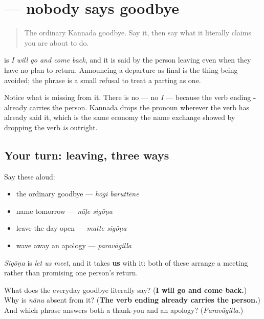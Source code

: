 \section[\texorpdfstring{\kn{ಹೋಗಿ} \kn{ಬರುತ್ತೇನೆ} (hōgi baruttēne)}{ಹೋಗಿ ಬರುತ್ತೇನೆ (hōgi baruttēne)}]{  — nobody says goodbye}

\label{lesson:KA-R04-second-pass-going-and-coming-back}



\begin{quote}
The ordinary Kannada goodbye. Say it, then say what it literally claims you are about to do.
\end{quote}

\begin{culture}
\textbf{ } is \emph{I will go and come back}, and it is said by the person leaving even when they have no plan to return. Announcing a departure as final is the thing being avoided; the phrase is a small refusal to treat a parting as one.

Notice what is missing from it. There is no \textbf{} — no \emph{I} — because the verb ending \textbf{-} already carries the person. Kannada drops the pronoun wherever the verb has already said it, which is the same economy the name exchange showed by dropping the verb \emph{is} outright.
\end{culture}

\subsection*{Your turn: leaving, three ways}
Say these aloud:

\begin{itemize}
\raggedright
  \item the ordinary goodbye — \emph{hōgi baruttēne}
  \item name tomorrow — \emph{nāḷe sigōṇa}
  \item leave the day open — \emph{matte sigōṇa}
  \item wave away an apology — \emph{paravāgilla}
\end{itemize}

\emph{Sigōṇa} is \emph{let us meet}, and it takes \textbf{us} with it: both of these arrange a meeting rather than promising one person's return.

\begin{tcolorbox}[breakable,colback=teal!4,colframe=teal!35!black,title={Before you move on}]
What does the everyday goodbye literally say? (\textbf{I will go and come back.}) Why is \emph{nānu} absent from it? (\textbf{The verb ending already carries the person.}) And which phrase answers both a thank-you and an apology? (\emph{Paravāgilla}.)
\end{tcolorbox}
